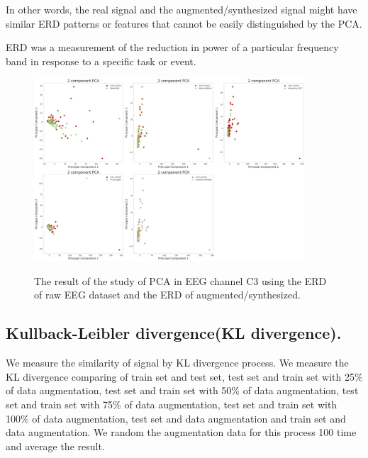 \documentclass[runningheads]{llncs}
\begin{document}



In other words, the real signal and the augmented/synthesized signal might have similar ERD patterns or features that cannot be easily distinguished by the PCA. 

ERD was a measurement of the reduction in power of a particular frequency band in response to a specific task or event. 

\begin{figure}[ht]
  \centering
  \caption[The result of PCA ]{The result of the study of PCA in EEG channel C3 using the ERD of raw EEG dataset and the ERD of augmented/synthesized.
}
  \includegraphics[width=0.9\textwidth]{fig/PCA.jpg}
  \label{fig:PCA}
\end{figure}

\subsection{Kullback-Leibler divergence(KL divergence).}

We measure the similarity of signal by KL divergence process. We measure the KL divergence comparing of train set and test set, test set and train set with 25\% of data augmentation, test set and train set with 50\% of data augmentation, test set and train set with 75\% of data augmentation, test set and train set with 100\% of data augmentation, test set and data augmentation and train set and data augmentation. We random the augmentation data for this process 100 time and average the result.
\end{document}
